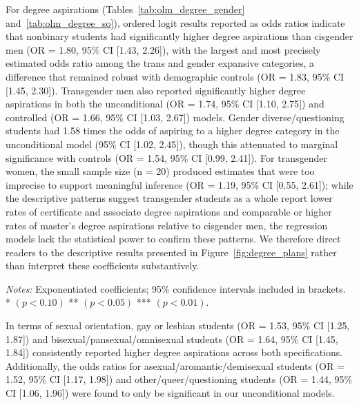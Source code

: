 For degree aspirations (Tables~\ref{tab:olm_degree_gender} and~\ref{tab:olm_degree_so}), ordered logit results reported
as odds ratios indicate that nonbinary students had significantly higher
degree aspirations than cisgender men (OR = 1.80, 95\% CI {[}1.43,
2.26{]}), with the largest and most precisely estimated odds ratio among
the trans and gender expansive categories, a difference that remained
robust with demographic controls (OR = 1.83, 95\% CI {[}1.45, 2.30{]}).
Transgender men also reported significantly higher degree aspirations in
both the unconditional (OR = 1.74, 95\% CI {[}1.10, 2.75{]}) and controlled
(OR = 1.66, 95\% CI {[}1.03, 2.67{]}) models. Gender diverse/questioning
students had 1.58 times the odds of aspiring to a higher degree category
in the unconditional model (95\% CI {[}1.02, 2.45{]}), though this
attenuated to marginal significance with controls (OR = 1.54, 95\% CI
{[}0.99, 2.41{]}). For transgender women, the small sample size (n = 20)
produced estimates that were too imprecise to support meaningful
inference (OR = 1.19, 95\% CI {[}0.55, 2.61{]}); while the descriptive
patterns suggest transgender students as a whole report lower rates of
certificate and associate degree aspirations and comparable or higher
rates of master's degree aspirations relative to cisgender men, the
regression models lack the statistical power to confirm these patterns.
We therefore direct readers to the descriptive results presented in
Figure~\ref{fig:degree_plans} rather than interpret these coefficients substantively.

\begin{table}[htbp]
\centering
\caption{Logit Models: Intent to Attend 4-Year College by Sexual Orientation (Odds Ratios)}
\label{tab:logit_4yr_so}

\medskip
\begin{minipage}{\linewidth}
\noindent\footnotesize\textit{Notes:} Exponentiated coefficients; 95\% confidence intervals included in
brackets. \\  * $(p<0.10)$ ** $(p<0.05)$ *** $(p<0.01)$.
\end{minipage}
\end{table}



In terms of sexual orientation, gay or lesbian students (OR = 1.53, 95\%
CI {[}1.25, 1.87{]}) and bisexual/pansexual/omnisexual students (OR =
1.64, 95\% CI {[}1.45, 1.84{]}) consistently reported higher degree
aspirations across both specifications. Additionally, the odds ratios
for asexual/aromantic/demisexual students (OR = 1.52, 95\% CI {[}1.17,
1.98{]}) and other/queer/questioning students (OR = 1.44, 95\% CI {[}1.06,
1.96{]}) were found to only be significant in our unconditional models.

